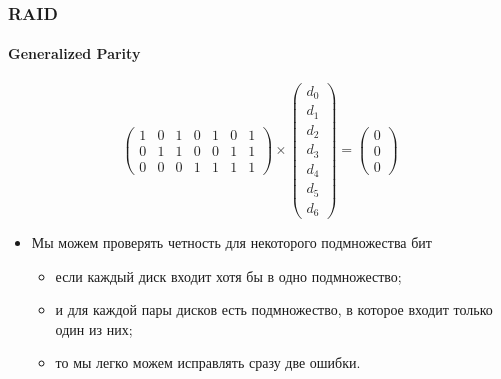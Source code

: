 \begin{frame}
\frametitle{RAID}
\framesubtitle{Generalized Parity}
\[
  \left(
    \begin{array}{ccccccc}
      1 & 0 & 1 & 0 & 1 & 0 & 1 \\
      0 & 1 & 1 & 0 & 0 & 1 & 1 \\
      0 & 0 & 0 & 1 & 1 & 1 & 1
    \end{array}
  \right) \times \left(
    \begin{array}{c}
      d_0 \\
      d_1 \\
      d_2 \\
      d_3 \\
      d_4 \\
      d_5 \\
      d_6
    \end{array}
  \right) = \left(
    \begin{array}{c}
      0 \\
      0 \\
      0
    \end{array}
  \right)
\]
\begin{itemize}
  \item Мы можем проверять четность для некоторого подмножества бит
  \begin{itemize}
    \item если каждый диск входит хотя бы в одно подмножество;
    \item и для каждой пары дисков есть подмножество, в которое входит только
    один из них;
    \item то мы легко можем исправлять сразу две ошибки.
  \end{itemize}
\end{itemize}
\end{frame}

